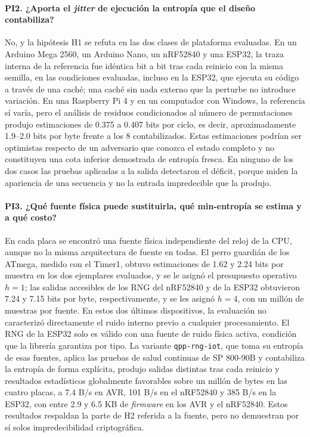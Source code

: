 \paragraph{PI2. ¿Aporta el \textit{jitter} de ejecución la entropía que el diseño contabiliza?} No, y la hipótesis H1 se refuta en las dos clases de plataforma evaluadas. En un Arduino Mega 2560, un Arduino Nano, un nRF52840 y una ESP32, la traza interna de la referencia fue idéntica bit a bit tras cada reinicio con la misma semilla, en las condiciones evaluadas, incluso en la ESP32, que ejecuta su código a través de una caché; una caché sin nada externo que la perturbe no introduce variación. En una Raspberry Pi 4 y en un computador con Windows, la referencia sí varía, pero el análisis de residuos condicionados al número de permutaciones produjo estimaciones de 0.375 a 0.407 bits por ciclo, es decir, aproximadamente 1.9--2.0 bits por byte frente a los 8 contabilizados. Estas estimaciones podrían ser optimistas respecto de un adversario que conozca el estado completo y no constituyen una cota inferior demostrada de entropía fresca. En ninguno de los dos casos las pruebas aplicadas a la salida detectaron el déficit, porque miden la apariencia de una secuencia y no la entrada impredecible que la produjo.

\paragraph{PI3. ¿Qué fuente física puede sustituirla, qué min-entropía se estima y a qué costo?} En cada placa se encontró una fuente física independiente del reloj de la CPU, aunque no la misma arquitectura de fuente en todas. El perro guardián de los ATmega, medido con el Timer1, obtuvo estimaciones de 1.62 y 2.24 bits por muestra en los dos ejemplares evaluados, y se le asignó el presupuesto operativo $h=1$; las salidas accesibles de los RNG del nRF52840 y de la ESP32 obtuvieron 7.24 y 7.15 bits por byte, respectivamente, y se les asignó $h=4$, con un millón de muestras por fuente. En estos dos últimos dispositivos, la evaluación no caracterizó directamente el ruido interno previo a cualquier procesamiento. El RNG de la ESP32 solo es válido con una fuente de ruido física activa, condición que la librería garantiza por tipo. La variante \texttt{qpp-rng-iot}, que toma su entropía de esas fuentes, aplica las pruebas de salud continuas de SP 800-90B y contabiliza la entropía de forma explícita, produjo salidas distintas tras cada reinicio y resultados estadísticos globalmente favorables sobre un millón de bytes en las cuatro placas, a 7.4 B/s en AVR, 101 B/s en el nRF52840 y 385 B/s en la ESP32, con entre 2.9 y 6.5 KB de \textit{firmware} en los AVR y el nRF52840. Estos resultados respaldan la parte de H2 referida a la fuente, pero no demuestran por sí solos impredecibilidad criptográfica.

